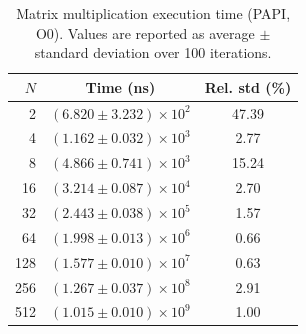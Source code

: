 \begin{table}[ht]
    \centering
    \caption{Matrix multiplication execution time (PAPI, O0). Values are reported as average $\pm$ standard deviation over 100 iterations.}
    \label{tab:mm-papi-o0}
    \begin{tabular}{rcc}
        \hline
        $N$ & Time (ns) & Rel. std (\%) \\
        \hline
        2 & $(6.820 \pm 3.232) \times 10^{2}$ & 47.39 \\
        4 & $(1.162 \pm 0.032) \times 10^{3}$ & 2.77 \\
        8 & $(4.866 \pm 0.741) \times 10^{3}$ & 15.24 \\
        16 & $(3.214 \pm 0.087) \times 10^{4}$ & 2.70 \\
        32 & $(2.443 \pm 0.038) \times 10^{5}$ & 1.57 \\
        64 & $(1.998 \pm 0.013) \times 10^{6}$ & 0.66 \\
        128 & $(1.577 \pm 0.010) \times 10^{7}$ & 0.63 \\
        256 & $(1.267 \pm 0.037) \times 10^{8}$ & 2.91 \\
        512 & $(1.015 \pm 0.010) \times 10^{9}$ & 1.00 \\
        \hline
    \end{tabular}
\end{table}
